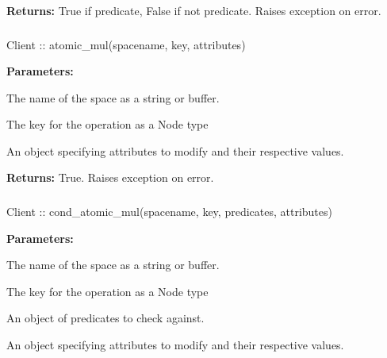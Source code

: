 \noindent\textbf{Returns:}
True if predicate, False if not predicate.  Raises exception on error.

\subsubsection{}
\label{api:nodejs:atomic_mul}
\begin{javascriptcode}
Client :: atomic_mul(spacename, key, attributes)
\end{javascriptcode}
\funcdesc 

\noindent\textbf{Parameters:}
\begin{description}[labelindent=\widthof{{\code{attributes}}},leftmargin=*,noitemsep,nolistsep,align=right]
\item[\code{spacename}] The name of the space as a string or buffer.
\item[\code{key}] The key for the operation as a Node type
\item[\code{attributes}] An object specifying attributes to modify and their respective values.
\end{description}

\noindent\textbf{Returns:}
True.  Raises exception on error.

\subsubsection{}
\label{api:nodejs:cond_atomic_mul}
\begin{javascriptcode}
Client :: cond_atomic_mul(spacename, key, predicates, attributes)
\end{javascriptcode}
\funcdesc 

\noindent\textbf{Parameters:}
\begin{description}[labelindent=\widthof{{\code{predicates}}},leftmargin=*,noitemsep,nolistsep,align=right]
\item[\code{spacename}] The name of the space as a string or buffer.
\item[\code{key}] The key for the operation as a Node type
\item[\code{predicates}] An object of predicates to check against.
\item[\code{attributes}] An object specifying attributes to modify and their respective values.
\end{description}

